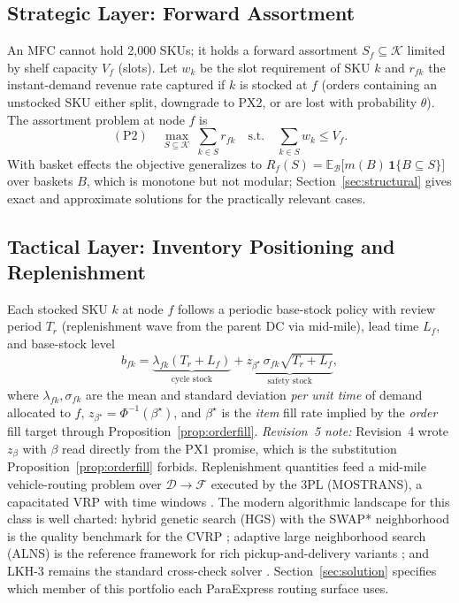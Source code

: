 \documentclass[10pt,twocolumn,letterpaper]{article}
\theoremstyle{definition}
\begin{document}
\subsection{Strategic Layer: Forward Assortment}

An MFC cannot hold 2,000 SKUs; it holds a forward assortment $S_f\subseteq\mathcal{K}$ limited by shelf capacity $V_f$ (slots). Let $w_k$ be the slot requirement of SKU $k$ and $r_{fk}$ the instant-demand revenue rate captured if $k$ is stocked at $f$ (orders containing an unstocked SKU either split, downgrade to PX2, or are lost with probability $\theta$). The assortment problem at node $f$ is
\begin{equation}\label{eq:p2}
(\mathrm{P2})\quad \max_{S\subseteq\mathcal{K}}\ \sum_{k\in S}r_{fk}\quad\text{s.t.}\quad\sum_{k\in S}w_k\le V_f.
\end{equation}
With basket effects the objective generalizes to $R_f(S)=\mathbb{E}_{\mathcal{B}}\bigl[m(B)\,\mathbf{1}\{B\subseteq S\}\bigr]$ over baskets $B$, which is monotone but not modular; Section~\ref{sec:structural} gives exact and approximate solutions for the practically relevant cases.

\subsection{Tactical Layer: Inventory Positioning and Replenishment}

Each stocked SKU $k$ at node $f$ follows a periodic base-stock policy with review period $T_r$ (replenishment wave from the parent DC via mid-mile), lead time $L_f$, and base-stock level
\begin{equation}\label{eq:basestock}
b_{fk}=\underbrace{\lambda_{fk}(T_r+L_f)}_{\text{cycle stock}}+\underbrace{z_{\beta^\star}\,\sigma_{fk}\sqrt{T_r+L_f}}_{\text{safety stock}},
\end{equation}
where $\lambda_{fk},\sigma_{fk}$ are the mean and standard deviation \emph{per unit time} of demand allocated to $f$, $z_{\beta^\star}=\Phi^{-1}(\beta^\star)$, and $\beta^\star$ is the \emph{item} fill rate implied by the \emph{order} fill target through Proposition~\ref{prop:orderfill}. \emph{Revision~5 note:} Revision~4 wrote $z_\beta$ with $\beta$ read directly from the PX1 promise, which is the substitution Proposition~\ref{prop:orderfill} forbids. Replenishment quantities feed a mid-mile vehicle-routing problem over $\mathcal{D}\to\mathcal{F}$ executed by the 3PL (MOSTRANS), a capacitated VRP with time windows \cite{toth2014}. The modern algorithmic landscape for this class is well charted: hybrid genetic search (HGS) with the SWAP* neighborhood is the quality benchmark for the CVRP \cite{vidal2022,wouda2024}; adaptive large neighborhood search (ALNS) is the reference framework for rich pickup-and-delivery variants \cite{ropke2006,voigt2025}; and LKH-3 remains the standard cross-check solver \cite{helsgaun2017}. Section~\ref{sec:solution} specifies which member of this portfolio each ParaExpress routing surface uses.
\end{document}
